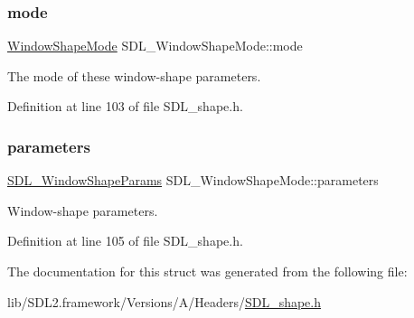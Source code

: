 \subsubsection{\texorpdfstring{mode}{mode}}
{\footnotesize\ttfamily \mbox{\hyperlink{_s_d_l__shape_8h_aa30948f2699e316a43b740eccebe5c20}{Window\+Shape\+Mode}} S\+D\+L\+\_\+\+Window\+Shape\+Mode\+::mode}



The mode of these window-\/shape parameters. 



Definition at line 103 of file S\+D\+L\+\_\+shape.\+h.

\mbox{\label{struct_s_d_l___window_shape_mode_a2f79bb294034156207fa6d88d3a8c819}} 
\subsubsection{\texorpdfstring{parameters}{parameters}}
{\footnotesize\ttfamily \mbox{\hyperlink{union_s_d_l___window_shape_params}{S\+D\+L\+\_\+\+Window\+Shape\+Params}} S\+D\+L\+\_\+\+Window\+Shape\+Mode\+::parameters}



Window-\/shape parameters. 



Definition at line 105 of file S\+D\+L\+\_\+shape.\+h.



The documentation for this struct was generated from the following file\+:\begin{DoxyCompactItemize}
\item 
lib/\+S\+D\+L2.\+framework/\+Versions/\+A/\+Headers/\mbox{\hyperlink{_s_d_l__shape_8h}{S\+D\+L\+\_\+shape.\+h}}\end{DoxyCompactItemize}
